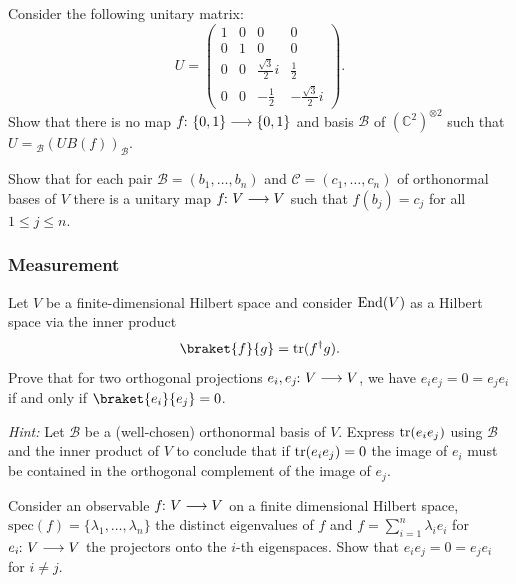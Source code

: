\documentclass[a4paper, oneside, 12pt]{amsart}
\begin{document}
\begin{exercise}
  Consider the following unitary matrix:
  \begin{equation*}
    U= \begin{pmatrix}
      1 & 0 & 0 & 0 \\
      0 & 1 & 0 & 0 \\
      0 & 0 & \tfrac{\sqrt{3}}{2}i & \tfrac{1}{2} \\
      0 & 0 & - \tfrac{1}{2} & -\tfrac{\sqrt{3}}{2}i
    \end{pmatrix}.
  \end{equation*}
  Show that there is no map \(f \from\{0,1\}\to\{0,1\}\) and basis \(\mathcal{B}\) of \(( \mathbb{C}^{2})^{\otimes 2}\) such that \(U = {}_{\mathcal{B}}(UB(f))_{\mathcal{B}}\).
\end{exercise}

\begin{exercise}
  Show that for each pair \(\mathcal{B} = (b_{1}, \dots , b_{n})\) and \(\mathcal{C} = (c_{1}, \dots , c_{n})\) of orthonormal bases of \(V\) there is a unitary map \(f \from V\to V\) such that \(f(b_{j}) = c_{j}\) for all \(1 \leq j \leq n\).
\end{exercise}
\subsubsection*{Measurement}

\begin{exercise}
  Let \( V \) be a finite-dimensional Hilbert space and consider \( \operatorname{End}(V) \) as a Hilbert space via the inner product
  \begin{equation*}
    \braket{f}{g} = \tr(f^{\dagger}g).
  \end{equation*}
  Prove that for two orthogonal projections  \(e_{i}, e_{j}\from V\to V\), we have
  \(e_{i} e_{j} =0 = e_{j} e_{i}\) if and only if \(\braket{e_{i}}{e_{j}} = 0\).

  \textit{Hint:} Let \(\mathcal{B}\) be a (well-chosen) orthonormal basis of \(V\).
  Express \(\operatorname{tr}(e_{i} e_{j})\) using \(\mathcal{B}\) and the inner product of \(V\) to conclude that if
  \(\operatorname{tr}(e_{i} e_{j}) =0\) the image of \(e_{i}\) must be contained in the orthogonal complement of the image of \(e_{j}\).
\end{exercise}

\begin{exercise}\label{exe:orthogonal-eigenspaces}
  Consider an observable \(f\from V\to V\) on a finite dimensional Hilbert space, \(\mathrm{spec}(f)= \{\lambda_{1}, \dots , \lambda_{n}\}\) the distinct eigenvalues of \(f\) and \(f = \sum_{i=1}^{n} \lambda_{i} e_{i}\) for \(e_{i} \from V\to V\) the projectors onto the \(i\)-th eigenspaces.
  Show that \(e_{i}e_{j}=0= e_{j}e_{i}\) for \(i \neq j\).
\end{exercise}
\end{document}
